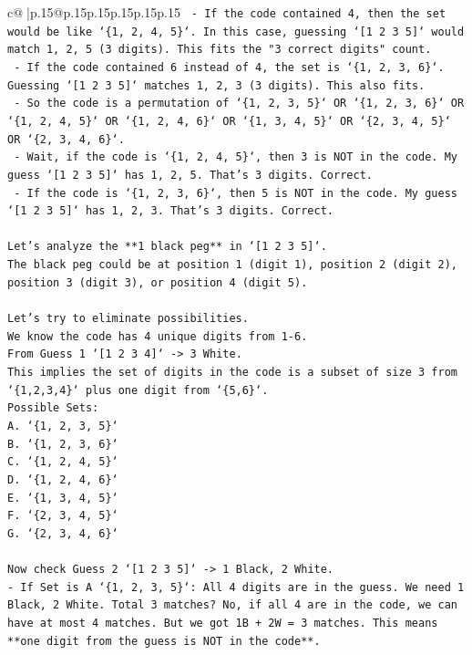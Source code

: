\documentclass{article}
\begin{document}
{\begin{supertabular}{c@{$\;$}|p{.15\linewidth}@{}p{.15\linewidth}p{.15\linewidth}p{.15\linewidth}p{.15\linewidth}p{.15\linewidth}}
{{{\texttt{     {-} If the code contained 4, then the set would be like `\{1, 2, 4, 5\}`. In this case, guessing `{[}1 2 3 5{]}` would match 1, 2, 5 (3 digits). This fits the "3 correct digits" count.} \\
\texttt{     {-} If the code contained 6 instead of 4, the set is `\{1, 2, 3, 6\}`. Guessing `{[}1 2 3 5{]}` matches 1, 2, 3 (3 digits). This also fits.} \\
\texttt{     {-} So the code is a permutation of `\{1, 2, 3, 5\}` OR `\{1, 2, 3, 6\}` OR `\{1, 2, 4, 5\}` OR `\{1, 2, 4, 6\}` OR `\{1, 3, 4, 5\}` OR `\{2, 3, 4, 5\}` OR `\{2, 3, 4, 6\}`.} \\
\texttt{     {-} Wait, if the code is `\{1, 2, 4, 5\}`, then 3 is NOT in the code. My guess `{[}1 2 3 5{]}` has 1, 2, 5. That's 3 digits. Correct.} \\
\texttt{     {-} If the code is `\{1, 2, 3, 6\}`, then 5 is NOT in the code. My guess `{[}1 2 3 5{]}` has 1, 2, 3. That's 3 digits. Correct.} \\
\\ 
\texttt{Let's analyze the **1 black peg** in `{[}1 2 3 5{]}`.} \\
\texttt{The black peg could be at position 1 (digit 1), position 2 (digit 2), position 3 (digit 3), or position 4 (digit 5).} \\
\\ 
\texttt{Let's try to eliminate possibilities.} \\
\texttt{We know the code has 4 unique digits from 1{-}6.} \\
\texttt{From Guess 1 `{[}1 2 3 4{]}` {-}> 3 White.} \\
\texttt{This implies the set of digits in the code is a subset of size 3 from `\{1,2,3,4\}` plus one digit from `\{5,6\}`.} \\
\texttt{Possible Sets:} \\
\texttt{A. `\{1, 2, 3, 5\}`} \\
\texttt{B. `\{1, 2, 3, 6\}`} \\
\texttt{C. `\{1, 2, 4, 5\}`} \\
\texttt{D. `\{1, 2, 4, 6\}`} \\
\texttt{E. `\{1, 3, 4, 5\}`} \\
\texttt{F. `\{2, 3, 4, 5\}`} \\
\texttt{G. `\{2, 3, 4, 6\}`} \\
\\ 
\texttt{Now check Guess 2 `{[}1 2 3 5{]}` {-}> 1 Black, 2 White.} \\
\texttt{{-} If Set is A `\{1, 2, 3, 5\}`: All 4 digits are in the guess. We need 1 Black, 2 White. Total 3 matches? No, if all 4 are in the code, we can have at most 4 matches. But we got 1B + 2W = 3 matches. This means **one digit from the guess is NOT in the code**.} \\
}}}
\end{supertabular}}
\end{document}
